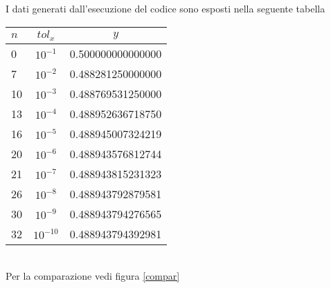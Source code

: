 

I dati generati dall'esecuzione del codice sono esposti  nella seguente tabella

\begin{tabular}{|l|c|c|}
\hline
$n$ & $tol_x$ & $y$ \\
\hline
0 & $10^{-1}$ & 0.500000000000000 \\
7 & $10^{-2}$ & 0.488281250000000 \\
10 & $10^{-3}$ &  0.488769531250000 \\
13 & $10^{-4}$ & 0.488952636718750 \\
16 & $10^{-5}$ & 0.488945007324219 \\
20 & $10^{-6}$ & 0.488943576812744 \\
21 & $10^{-7}$ & 0.488943815231323 \\
26 & $10^{-8}$ & 0.488943792879581 \\
30 & $10^{-9}$ & 0.488943794276565 \\
32 & $10^{-10}$ & 0.488943794392981 \\
\hline
\end{tabular}\\

Per la comparazione vedi figura \ref{compar}

